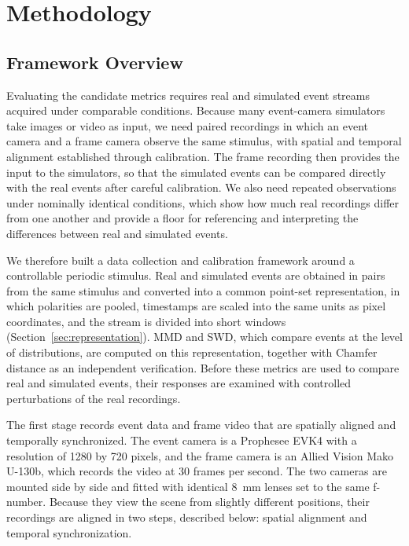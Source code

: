 \section{Methodology}
\label{sec:methodology}


\subsection{Framework Overview}
\label{sec:framework}

Evaluating the candidate metrics requires real and simulated event streams acquired under comparable conditions. Because many event-camera simulators take images or video as input, we need paired recordings in which an event camera and a frame camera observe the same stimulus, with spatial and temporal alignment established through calibration. The frame recording then provides the input to the simulators, so that the simulated events can be compared directly with the real events after careful calibration. We also need repeated observations under nominally identical conditions, which show how much real recordings differ from one another and provide a floor for referencing and interpreting the differences between real and simulated events.

We therefore built a data collection and calibration framework around a controllable periodic stimulus. Real and simulated events are obtained in pairs from the same stimulus and converted into a common point-set representation, in which polarities are pooled, timestamps are scaled into the same units as pixel coordinates, and the stream is divided into short windows (Section~\ref{sec:representation}). MMD and SWD, which compare events at the level of distributions, are computed on this representation, together with Chamfer distance as an independent verification. Before these metrics are used to compare real and simulated events, their responses are examined with controlled perturbations of the real recordings.

The first stage records event data and frame video that are spatially aligned and temporally synchronized. The event camera is a Prophesee EVK4 with a resolution of 1280 by 720 pixels, and the frame camera is an Allied Vision Mako U-130b, which records the video at 30 frames per second. The two cameras are mounted side by side and fitted with identical 8~mm lenses set to the same f-number. Because they view the scene from slightly different positions, their recordings are aligned in two steps, described below: spatial alignment and temporal synchronization.

